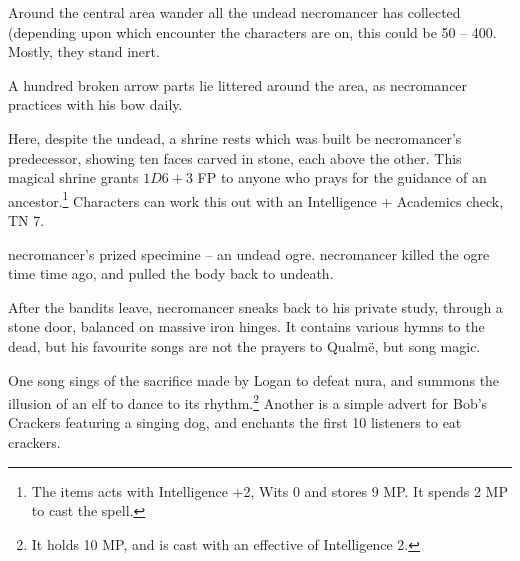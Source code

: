 \begin{multicols}{2}




Around the central area wander all the undead \gls{necromancer} has collected (depending upon which encounter the characters are on, this could be 50 -- 400.  Mostly, they stand inert.

A hundred broken arrow parts lie littered around the area, as \gls{necromancer} practices with his bow daily.


\ghoul


Here, despite the undead, a shrine rests which was built be \gls{necromancer}'s predecessor, showing ten faces carved in stone, each above the other.  This magical shrine grants $1D6 + 3$ FP to anyone who prays for the guidance of an ancestor.\footnote{The items acts with Intelligence +2, Wits 0 and stores 9 MP. It spends 2 MP to cast the spell.}  Characters can work this out with an Intelligence + Academics check, TN 7.


\Gls{necromancer}'s prized specimine -- an undead ogre.  \Gls{necromancer} killed the ogre time time ago, and pulled the body back to undeath.




After the bandits leave, \gls{necromancer} sneaks back to his private study, through a stone door, balanced on massive iron hinges.  It contains various hymns to the dead, but his favourite songs are not the prayers to Qualm\"{e}, but song magic.

One song sings of the sacrifice made by Logan to defeat nura, and summons the illusion of an elf to dance to its rhythm.\footnote{It holds 10 MP, and is cast with an effective of Intelligence 2.}  Another is a simple advert for Bob's Crackers featuring a singing dog, and enchants the first 10 listeners to eat crackers.


\end{multicols}
